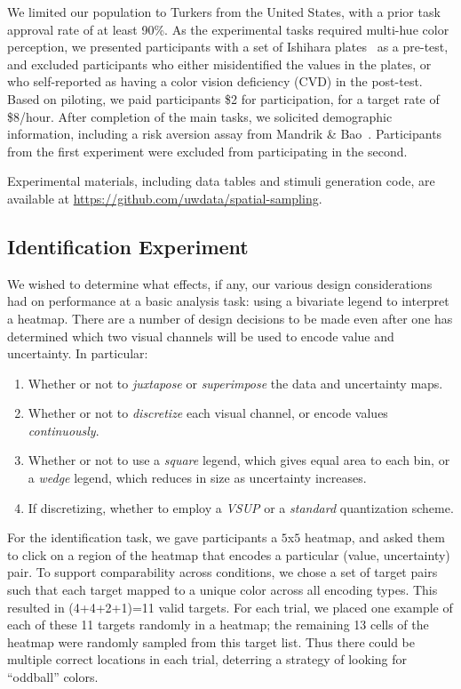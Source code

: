 We limited our population to Turkers from the United States, with a prior task approval rate of at least 90\%. As the experimental tasks required multi-hue color perception, we presented participants with a set of Ishihara plates~\cite{hardy1945tests} as a pre-test, and excluded participants who either misidentified the values in the plates, or who self-reported as having a color vision deficiency (CVD) in the post-test. Based on piloting, we paid participants \$2 for participation, for a target rate of \$8/hour. After completion of the main tasks, we solicited demographic information, including a risk aversion assay from Mandrik \& Bao~\cite{mandrik2005exploring}. Participants from the first experiment were excluded from participating in the second.

Experimental materials, including data tables and stimuli generation code, are available at \url{https://github.com/uwdata/spatial-sampling}.

\subsection{Identification Experiment}

We wished to determine what effects, if any, our various design considerations had on performance at a basic analysis task: using a bivariate legend to interpret a heatmap. There are a number of design decisions to be made even after one has determined which two visual channels will be used to encode value and uncertainty.
In particular:
\begin{enumerate}
	\item Whether or not to \emph{juxtapose} or \emph{superimpose} the data and uncertainty maps.
	\item Whether or not to \emph{discretize} each visual channel, or encode values \emph{continuously}.
	\item Whether or not to use a \emph{square} legend, which gives equal area to each bin, or a \emph{wedge} legend, which reduces in size as uncertainty increases.
	\item If discretizing, whether to employ a \emph{VSUP} or a \emph{standard} quantization scheme.
\end{enumerate}

For the identification task, we gave participants a $5$x$5$ heatmap, and asked them to click on a region of the heatmap that encodes a particular (value, uncertainty) pair. To support comparability across conditions, we chose a set of target pairs such that each target mapped to a unique color across all encoding types. This resulted in (4+4+2+1)=11 valid targets. For each trial, we placed one example of each of these 11 targets randomly in a heatmap; the remaining 13 cells of the heatmap were randomly sampled from this target list. Thus there could be multiple correct locations in each trial, deterring a strategy of looking for ``oddball'' colors. 

